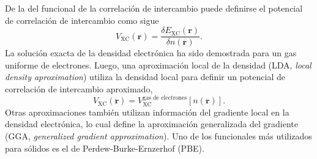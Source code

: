 De la  del funcional de la correlación de intercambio puede 
definirse el potencial de correlación de intercambio como sigue
\begin{equation}
    V_{\text{XC}}(\mathbf{r}) = \frac{\delta E_{\text{XC}}(\mathbf{r})}{\delta n(\mathbf{r})}.
\end{equation}
La solución exacta de la densidad electrónica ha sido demostrada para un gas 
uniforme de electrones. Luego, una aproximación local de la densidad (LDA,
\textit{local density aproximation}) utiliza la densidad local para definir 
un potencial de correlación de intercambio aproximado,
\begin{equation}
    V_{\text{XC}}(\mathbf{r}) = V_{\text{XC}}^{\text{gas de electrones}}[n(\mathbf{r})].
\end{equation}
Otras aproximaciones también utilizan información del gradiente local en 
la densidad electrónica, lo cual define la aproximación generalizada del 
gradiente (GGA, \textit{generalized gradient approximation}). Uno de los
funcionales más utilizados para sólidos es el de Perdew-Burke-Ernzerhof (PBE).
